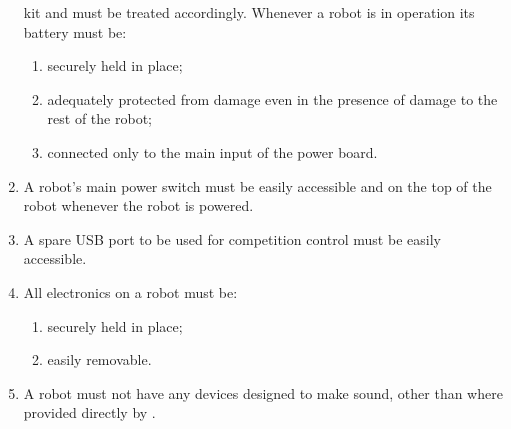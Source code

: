 \begin{enumerate}
      kit and must be treated accordingly. Whenever a robot is in operation
      its battery must be:
  \begin{enumerate}
    \item securely held in place;
    \item adequately protected from damage even in the presence of damage to the
          rest of the robot;
    \item connected only to the main input of the power board.
  \end{enumerate}
\item A robot's main power switch must be easily accessible and on the top of
      the robot whenever the robot is powered.
\item A spare USB port to be used for competition control must be easily accessible.
\item All electronics on a robot must be:
  \begin{enumerate}
    \item securely held in place;
    \item easily removable.
  \end{enumerate}

\item A robot must not have any devices designed to make sound, other
      than where provided directly by \org{}.
\end{enumerate}
